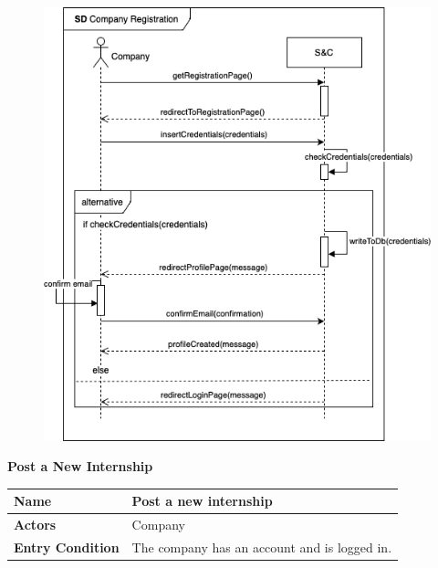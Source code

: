 \begin{enumerate}[label=\textbf{[US\arabic*]}, left = 0pt, align = left, resume]
            \newpage
            \begin{figure}[h!]
                \centering  \includegraphics[width=1\textwidth]{RASD/Images/UseCases/CompanyRegistration.drawio.png}
                \label{fig:CompanyRegistration}
            \end{figure}

            \newpage
            \item \textbf{Post a New Internship}
            
            \begin{longtable}{|l|p{11cm}|}  
                \hline
                \textbf{Name} & 
                    \textbf{Post a new internship} \\
                \hline
                
                \textbf{Actors} & 
                    Company \\
                \hline
                
                \textbf{Entry Condition} & 
                    The company has an account and is logged in. \\
                \hline
                

\end{longtable}
\end{enumerate}
